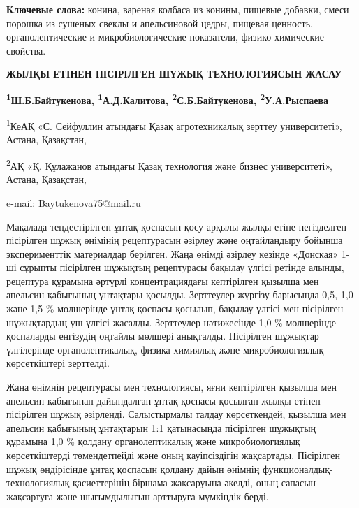 {\bfseries Ключевые слова:} конина, вареная колбаса из конины, пищевые
добавки, смеси порошка из сушеных свеклы и апельсиновой цедры, пищевая
ценность, органолептические и микробиологические показатели,
физико-химические свойства.

\begin{articleheader}
{\bfseries ЖЫЛҚЫ ЕТІНЕН ПІСІРІЛГЕН ШҰЖЫҚ ТЕХНОЛОГИЯСЫН ЖАСАУ}

{\bfseries
\textsuperscript{1}Ш.Б.Байтукенова\textsuperscript{\envelope },
\textsuperscript{1}А.Д.Калитова,
\textsuperscript{2}С.Б.Байтукенова,
\textsuperscript{2}У.А.Рыспаева
}
\end{articleheader}

\begin{affiliation}
\textsuperscript{1}КеАҚ «С. Сейфуллин атындағы Қазақ агротехникалық
зерттеу университеті», Астана, Қазақстан,

\textsuperscript{2}АҚ «Қ. Құлажанов атындағы Қазақ технология және
бизнес университеті», Астана, Қазақстан,

e-mail: Baytukenova75@mail.ru
\end{affiliation}

Мақалада теңдестірілген ұнтақ қоспасын қосу арқылы жылқы етіне
негізделген пісірілген шұжық өнімінің рецептурасын әзірлеу және
оңтайландыру бойынша эксперименттік материалдар берілген. Жаңа өнімді
әзірлеу кезінде «Донская» 1-ші сұрыпты пісірілген шұжықтың рецептурасы
бақылау үлгісі ретінде алынды, рецептура құрамына әртүрлі
концентрациядағы кептірілген қызылша мен апельсин қабығының ұнтақтары
қосылды. Зерттеулер жүргізу барысында 0,5, 1,0 және 1,5 \% мөлшерінде
ұнтақ қоспасы қосылып, бақылау үлгісі мен пісірілген шұжықтардың үш
үлгісі жасалды. Зерттеулер нәтижесінде 1,0 \% мөлшерінде қоспаларды
енгізудің оңтайлы мөлшері анықталды. Пісірілген шұжықтар үлгілерінде
органолептикалық, физика-химиялық және микробиологиялық көрсеткіштері
зерттелді.

Жаңа өнімнің рецептурасы мен технологиясы, яғни кептірілген қызылша мен
апельсин қабығынан дайындалған ұнтақ қоспасы қосылған жылқы етінен
пісірілген шұжық әзірленді. Салыстырмалы талдау көрсеткендей, қызылша
мен апельсин қабығының ұнтақтарын 1:1 қатынасында пісірілген шұжықтың
құрамына 1,0 \% қолдану органолептикалық және микробиологиялық
көрсеткіштерді төмендетпейді және оның қауіпсіздігін жақсартады.
Пісірілген шұжық өндірісінде ұнтақ қоспасын қолдану дайын өнімнің
функционалдық-технологиялық қасиеттерінің біршама жақсаруына әкелді,
оның сапасын жақсартуға және шығымдылығын арттыруға мүмкіндік берді.

